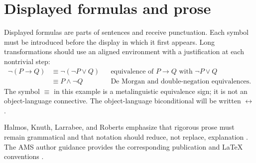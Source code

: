 \section{Displayed formulas and prose}
\label{sec:writing-foundations-05}

Displayed formulas are parts of sentences and receive punctuation.  Each
symbol must be introduced before the display in which it first appears.
Long transformations should use an aligned environment with a justification at
each nontrivial step:
\[
\begin{aligned}
  \neg(P\to Q)
    &\equiv \neg(\neg P\lor Q) && \text{equivalence of }P\to Q
    \text{ with }\neg P\lor Q\\
    &\equiv P\land\neg Q       && \text{De Morgan and double-negation
    equivalences}.
\end{aligned}
\]
The symbol \(\equiv\) in this example is a metalinguistic equivalence sign; it
is not an object-language connective.  The object-language biconditional will
be written \(\leftrightarrow\).

Halmos, Knuth, Larrabee, and Roberts emphasize that rigorous prose must
remain grammatical and that notation should reduce, not replace, explanation
\cite{Halmos1970,KnuthLarrabeeRoberts1989}.  The AMS author guidance provides
the corresponding publication and \LaTeX{} conventions
\cite{AMSAuthorHandbook}.

